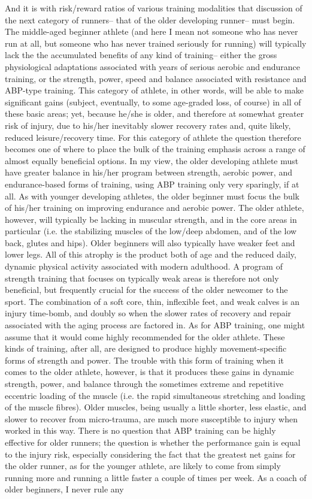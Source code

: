 And it is with risk/reward ratios of various training modalities that discussion of the next category of runners-- that of the older developing runner-- must begin. The middle-aged beginner athlete (and here I mean not someone who has never run at all, but someone who has never trained seriously for running) will typically lack the the accumulated benefits of any kind of training-- either the gross physiological adaptations associated with years of serious aerobic and endurance training, or the strength, power, speed and balance associated with resistance and ABP-type training. This category of athlete, in other words, will be able to make significant gains (subject, eventually, to some age-graded loss, of course) in all of these basic areas; yet, because he/she is older, and therefore at somewhat greater risk of injury, due to his/her inevitably slower recovery rates and, quite likely, reduced leisure/recovery time. For this category of athlete the question therefore becomes one of where to place the bulk of the training emphasis across a range of almost equally beneficial options. In my view, the older developing athlete must have greater balance in his/her program between strength, aerobic power, and endurance-based forms of training, using ABP training only very sparingly, if at all. As with younger developing athletes, the older beginner must focus the bulk of his/her training on improving endurance and aerobic power. The older athlete, however, will typically be lacking in muscular strength, and in the core areas in particular (i.e. the stabilizing muscles of the low/deep abdomen, and of the low back, glutes and hips). Older beginners will also typically have weaker feet and lower legs. All of this atrophy is the product both of age and the reduced daily, dynamic physical activity associated with modern adulthood. A program of strength training that focuses on typically weak areas is therefore not only beneficial, but frequently crucial for the success of the older newcomer to the sport. The combination of a soft core, thin, inflexible feet, and weak calves is an injury time-bomb, and doubly so when the slower rates of recovery and repair associated with the aging process are factored in. As for ABP training, one might assume that it would come highly recommended for the older athlete. These kinds of training, after all, are designed to produce highly movement-specific forms of strength and power. The trouble with this form of training when it comes to the older athlete, however, is that it produces these gains in dynamic strength, power, and balance through the sometimes extreme and repetitive eccentric loading of the muscle (i.e. the rapid simultaneous stretching and loading of the muscle fibres). Older muscles, being usually a little shorter, less elastic, and slower to recover from micro-trauma, are much more susceptible to injury when worked in this way. There is no question that ABP training can be highly effective for older runners; the question is whether the performance gain is equal to the injury risk, especially considering the fact that the greatest net gains for the older runner, as for the younger athlete, are likely to come from simply running more and running a little faster a couple of times per week. As a coach of older beginners, I never rule any 